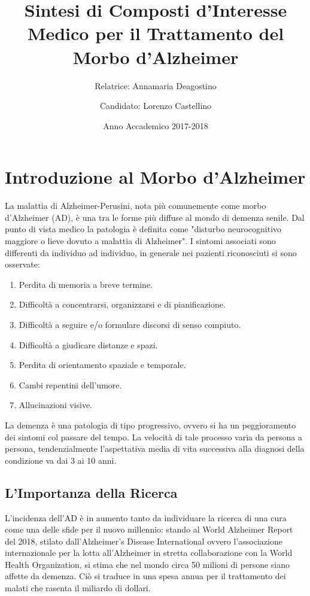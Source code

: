 \documentclass[a4paper, 12pt]{article}
\title{Sintesi di Composti d'Interesse Medico per il Trattamento del Morbo d'Alzheimer}
\author{
	Relatrice: Annamaria Deagostino
	\and
	Candidato: Lorenzo Castellino
}
\date{Anno Accademico 2017-2018}
\begin{document}
\maketitle
\setcounter{page}{0}
\newpage
\tableofcontents
\newpage
{}

\section{Introduzione al Morbo d'Alzheimer}
La malattia di Alzheimer-Perusini, nota più comunemente come morbo d'Alzheimer (AD), è una tra le forme più diffuse al mondo di demenza senile. Dal punto di vista medico la patologia è definita come "disturbo neurocognitivo maggiore o lieve dovuto a malattia di Alzheimer".\cite{american_psychiatric_association_diagnostic_2013}
I sintomi associati sono differenti da individuo ad individuo, in generale nei pazienti riconosciuti si sono osservate:
\begin{enumerate}
	\item Perdita di memoria a breve termine.
	\item Difficoltà a concentrarsi, organizzarsi e di pianificazione.
	\item Difficoltà a seguire e/o formulare discorsi di senso compiuto.
	\item Difficoltà a giudicare distanze e spazi.
	\item Perdita di orientamento spaziale e temporale.
	\item Cambi repentini dell'umore.
	\item Allucinazioni visive.
\end{enumerate}
La demenza è una patologia di tipo progressivo, ovvero si ha un peggioramento dei sintomi col passare del tempo. La velocità di tale processo varia da persona a persona, tendenzialmente l'aspettativa media di vita successiva alla diagnosi della condizione va dai 3 ai 10 anni. \cite{todd_survival_2013}

\subsection{L'Importanza della Ricerca}
L'incidenza dell'AD è in aumento tanto da individuare la ricerca di una cura come una delle sfide per il nuovo millennio: stando al World Alzheimer Report del 2018, stilato dall'Alzheimer's Disease International ovvero l'associazione internazionale per la lotta all'Alzheimer in stretta collaborazione con la World Health Organization, si stima che nel mondo circa 50 milioni di persone siano affette da demenza. Ciò si traduce in una spesa annua per il trattamento dei malati che rasenta il miliardo di dollari.
\end{document}
